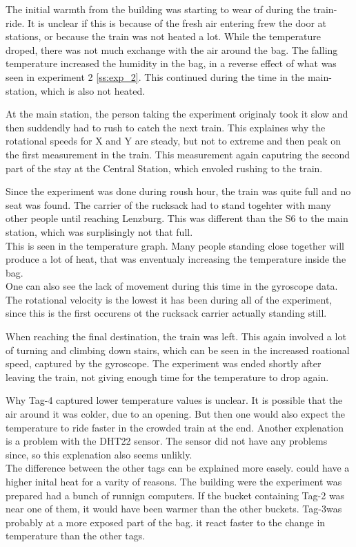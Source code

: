 The initial warmth from the building was starting to wear of during the train-ride.
It is unclear if this is because of the fresh air entering frew the door at stations, or because the train was not heated a lot.
While the temperature droped, there was not much exchange with the air around the bag. 
The falling temperature increased the humidity in the bag, in a reverse effect of what was seen in experiment 2 \ref{ss:exp_2}.
This continued during the time in the main-station, which is also not heated.

At the main station, the person taking the experiment originaly took it slow and then suddendly had to rush to catch the next train.
This explaines why the rotational speeds for X and Y are steady, but not to extreme and then peak on the first measurement in the train.
This measurement again caputring the second part of the stay at the Central Station, which envoled rushing to the train.


Since the experiment was done during roush hour, the train was quite full and no seat was found.
The carrier of the rucksack had to stand togehter with many other people until reaching Lenzburg. This was different than the S6 to the main station, which was surplisingly not that full.\\
This is seen in the temperature graph.
Many people standing close together will produce a lot of heat, that was enventualy increasing the temperature inside the bag.\\
One can also see the lack of movement during this time in the gyroscope data.
The rotational velocity is the lowest it has been during all of the experiment, since this is the first occurens ot the rucksack carrier actually standing still.

When reaching the final destination, the train was left.
This again involved a lot of turning and climbing down stairs, which can be seen in the increased roational speed, captured by the gyroscope.
The experiment was ended shortly after leaving the train, not giving enough time for the temperature to drop again.

Why Tag-4 captured lower temperature values is unclear.
It is possible that the air around it was colder, due to an opening.
But then one would also expect the temperature to ride faster in the crowded train at the end.
Another explenation is a problem with the DHT22 sensor.
The sensor did not have any problems since, so this explenation also seems unlikly.\\
The difference between the other tags can be explained more easely.
could have a higher inital heat for a varity of reasons.
The building were the experiment was prepared had a bunch of runnign computers.
If the bucket containing Tag-2 was near one of them, it would have been warmer than the other buckets.
Tag-3was probably at a more exposed part of the bag. it react faster to the change in temperature than the other tags.


